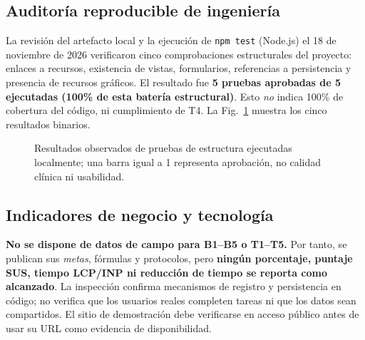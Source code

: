 \documentclass[conference,10pt]{IEEEtran}
\begin{document}
\subsection{Auditoría reproducible de ingeniería}
La revisión del artefacto local y la ejecución de \texttt{npm test} (Node.js) el 18 de noviembre de 2026 verificaron cinco comprobaciones estructurales del proyecto: enlaces a recursos, existencia de vistas, formularios, referencias a persistencia y presencia de recursos gráficos. El resultado fue \textbf{5 pruebas aprobadas de 5 ejecutadas (100\% de esta batería estructural)}. Esto \emph{no} indica 100\% de cobertura del código, ni cumplimiento de T4. La Fig.~\ref{fig:tests} muestra los cinco resultados binarios.
\begin{figure}[!t]
\centering
{}
\caption{Resultados observados de pruebas de estructura ejecutadas localmente; una barra igual a 1 representa aprobación, no calidad clínica ni usabilidad.}
\label{fig:tests}
\end{figure}

\subsection{Indicadores de negocio y tecnología}
\textbf{No se dispone de datos de campo para B1--B5 o T1--T5.} Por tanto, se publican sus \emph{metas}, fórmulas y protocolos, pero \textbf{ningún porcentaje, puntaje SUS, tiempo LCP/INP ni reducción de tiempo se reporta como alcanzado}. La inspección confirma mecanismos de registro y persistencia en código; no verifica que los usuarios reales completen tareas ni que los datos sean compartidos. El sitio de demostración debe verificarse en acceso público antes de usar su URL como evidencia de disponibilidad.
\end{document}
